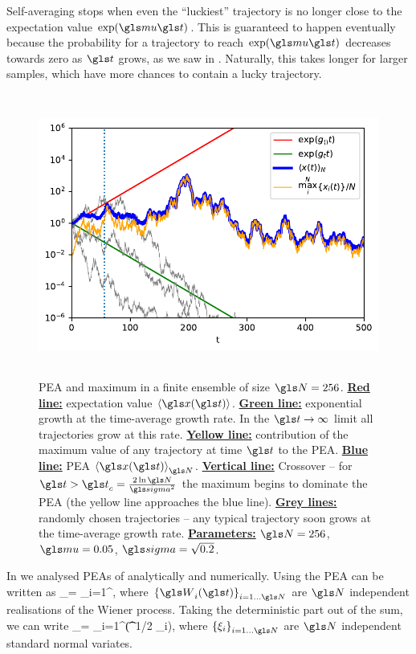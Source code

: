 Self-averaging stops when even the ``luckiest'' trajectory is no longer close to the expectation value $\exp(\gmu \t)$. This is guaranteed to happen eventually because the probability for a trajectory to reach $\exp(\gmu \t)$ decreases towards zero as $\t$ grows, as we saw in . Naturally, this takes longer for larger samples, which have more chances to contain a lucky trajectory. 

\begin{figure}
\centering
\includegraphics[height=9.3cm]{./chapter_3/figs/trajectories.pdf}
\caption{PEA and maximum in a finite ensemble of size $\N=256$. {\bf \underline{Red line:}} expectation value $\ave{\x(\t)}$. 
{\bf \underline{Green line:}} exponential growth at the time-average growth rate. In the $\t\to\infty$ limit all trajectories grow at this rate. 
{\bf \underline{Yellow line:}} contribution of the maximum value of any trajectory at time $\t$ to the PEA.  
{\bf \underline{Blue line:}} PEA $\ave{\x(\t)}_\N$.
{\bf \underline{Vertical line:}} Crossover -- for $\t>\t_c=\frac{2\ln \N}{\gsigma^2}$ the maximum begins to dominate the PEA (the yellow line approaches the blue line).
{\bf \underline{Grey lines:}} randomly chosen trajectories -- any typical trajectory soon grows at the time-average growth rate.  
{\bf \underline{Parameters:}} $\N=256$, $\gmu=0.05$, $\gsigma=\sqrt{0.2}$.}
\end{figure}
\FloatBarrier

In \cite{PetersKlein2013} we analysed PEAs of \GBM analytically and numerically. Using  the PEA can be written as
\be
\ave{\x}_\N= \sum_{i=1}^\N \exp{},
\ee
where $\left\{\gW_i(\t)\right\}_{i=1\dots \N}$ are $\N$ independent realisations of the Wiener process. Taking the deterministic part out of the sum, we can write
\be
\ave{\x}_\N=\exp{}  \sum_{i=1}^\N \exp\left(\t^{1/2} \gsigma \xi_i\right),
\ee
where $\left\{\xi_i\right\}_{i=1\dots \N}$ are $\N$ independent standard normal variates.

